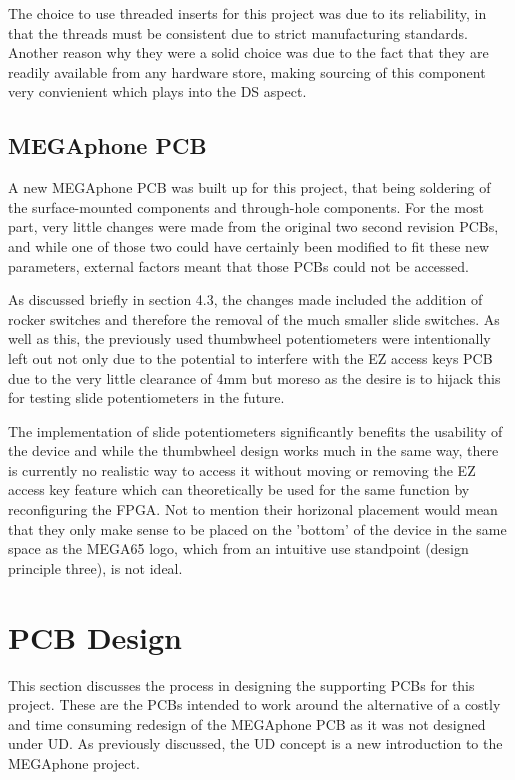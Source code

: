 The choice to use threaded inserts for this project was due to its reliability, in that the threads must be consistent due to strict manufacturing standards.
Another reason why they were a solid choice was due to the fact that they are readily available from any hardware store, making sourcing of this component very convienient which plays into the DS aspect.

\subsection{MEGAphone PCB}
A new MEGAphone PCB was built up for this project, that being soldering of the surface-mounted components and through-hole components.
For the most part, very little changes were made from the original two second revision PCBs, and while one of those two could have certainly been modified to fit these new parameters, external factors meant that those PCBs could not be accessed.

As discussed briefly in section 4.3, the changes made included the addition of rocker switches and therefore the removal of the much smaller slide switches. %
As well as this, the previously used thumbwheel potentiometers were intentionally left out not only due to the potential to interfere with the EZ access keys PCB due to the very little clearance of 4mm but moreso as the desire is to hijack this for testing slide potentiometers in the future.

The implementation of slide potentiometers significantly benefits the usability of the device and while the thumbwheel design works much in the same way, there is currently no realistic way to access it without moving or removing the EZ access key feature which can theoretically be used for the same function by reconfiguring the FPGA.
Not to mention their horizonal placement would mean that they only make sense to be placed on the 'bottom' of the device in the same space as the MEGA65 logo, which from an intuitive use standpoint (design principle three), is not ideal.


\section{PCB Design}
This section discusses the process in designing the supporting PCBs for this project.
These are the PCBs intended to work around the alternative of a costly and time consuming redesign of the MEGAphone PCB as it was not designed under UD.
As previously discussed, the UD concept is a new introduction to the MEGAphone project.

